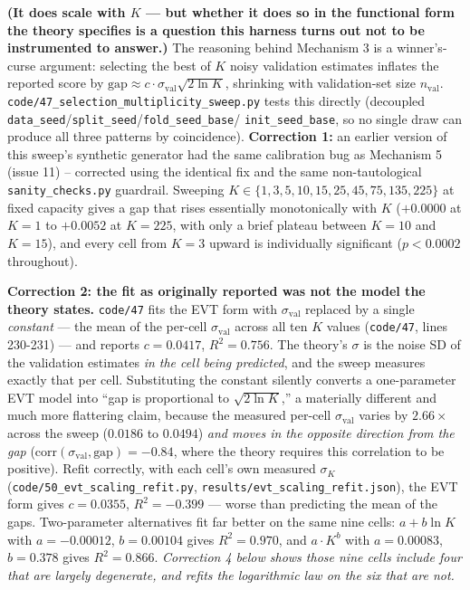 \documentclass[10pt]{article} %
\begin{document}
\textbf{(It does scale with $K$ --- but whether it does so in the functional
form the theory specifies is a question this harness turns out not to be
instrumented to answer.)} The reasoning behind Mechanism 3 is a winner's-curse
argument: selecting the best of $K$ noisy validation estimates inflates the
reported score by $\text{gap}\approx c\cdot\sigma_{\text{val}}\sqrt{2\ln K}$,
shrinking with validation-set size $n_{\text{val}}$.
\texttt{code/47\_selection\_multiplicity\_sweep.py} tests this directly
(decoupled \texttt{data\_seed}/\texttt{split\_seed}/\texttt{fold\_seed\_base}/
\texttt{init\_seed\_base}, so no single draw can produce all three patterns by
coincidence). \textbf{Correction 1:} an earlier version of this sweep's
synthetic generator had the same calibration bug as Mechanism 5 (issue 11) --
corrected using the identical fix and the same non-tautological
\texttt{sanity\_checks.py} guardrail. Sweeping
$K\in\{1,3,5,10,15,25,45,75,135,225\}$ at fixed capacity gives a gap that rises
essentially monotonically with $K$ ($+0.0000$ at $K{=}1$ to $+0.0052$ at
$K{=}225$, with only a brief plateau between $K{=}10$ and $K{=}15$), and every
cell from $K{=}3$ upward is individually significant ($p<0.0002$ throughout).

\textbf{Correction 2: the fit as originally reported was not the model the
theory states.} \texttt{code/47} fits the EVT form with $\sigma_{\text{val}}$
replaced by a single \emph{constant} --- the mean of the per-cell
$\sigma_{\text{val}}$ across all ten $K$ values (\texttt{code/47}, lines
230-231) --- and reports $c=0.0417$, $R^2=0.756$. The theory's $\sigma$ is the
noise SD of the validation estimates \emph{in the cell being predicted}, and
the sweep measures exactly that per cell. Substituting the constant silently
converts a one-parameter EVT model into ``gap is proportional to
$\sqrt{2\ln K}$,'' a materially different and much more flattering claim,
because the measured per-cell $\sigma_{\text{val}}$ varies by $2.66\times$
across the sweep ($0.0186$ to $0.0494$) \emph{and moves in the opposite
direction from the gap}
($\mathrm{corr}(\sigma_{\text{val}},\text{gap})=-0.84$, where the theory
requires this correlation to be positive). Refit correctly, with each cell's
own measured $\sigma_K$ (\texttt{code/50\_evt\_scaling\_refit.py},
\texttt{results/evt\_scaling\_refit.json}), the EVT form gives $c=0.0355$,
$R^2=\mathbf{-0.399}$ --- worse than predicting the mean of the gaps.
Two-parameter alternatives fit far better on the same nine cells: $a+b\ln K$
with $a=-0.00012$, $b=0.00104$ gives $R^2=\mathbf{0.970}$, and $a\cdot K^{b}$
with $a=0.00083$, $b=0.378$ gives $R^2=0.866$. \emph{Correction 4 below shows
those nine cells include four that are largely degenerate, and refits the
logarithmic law on the six that are not.}
\end{document}
